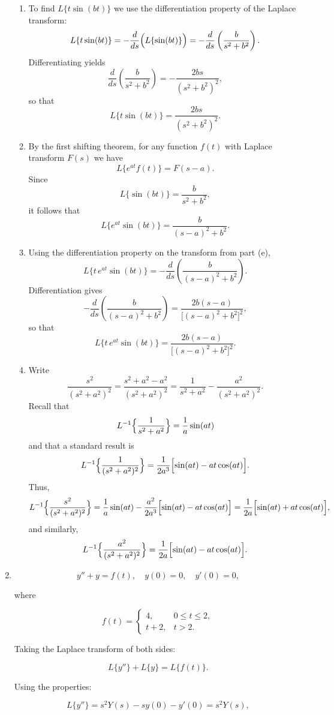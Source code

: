 \documentclass[12pt]{article}
\begin{document}
\begin{enumerate}
\begin{enumerate}[label=(\alph*)]
\item To find \(L\{t\sin(bt)\}\) we use the differentiation property of the Laplace transform:
\[
L\{t\sin(bt)\}=-\frac{d}{ds}\Bigl(L\{\sin(bt)\}\Bigr)
=-\frac{d}{ds}\left(\frac{b}{s^2+b^2}\right).
\]
Differentiating yields
\[
\frac{d}{ds}\left(\frac{b}{s^2+b^2}\right)=-\frac{2bs}{(s^2+b^2)^2},
\]
so that
\[
L\{t\sin(bt)\}=\frac{2bs}{(s^2+b^2)^2}.
\]

\item By the first shifting theorem, for any function \(f(t)\) with Laplace transform \(F(s)\) we have
\[
L\{e^{at}f(t)\}=F(s-a).
\]
Since
\[
L\{\sin(bt)\}=\frac{b}{s^2+b^2},
\]
it follows that
\[
L\{e^{at}\sin(bt)\}=\frac{b}{(s-a)^2+b^2}.
\]

\item Using the differentiation property on the transform from part (e),
\[
L\{t\,e^{at}\sin(bt)\}=-\frac{d}{ds}\left(\frac{b}{(s-a)^2+b^2}\right).
\]
Differentiation gives
\[
-\frac{d}{ds}\left(\frac{b}{(s-a)^2+b^2}\right)
=\frac{2b(s-a)}{\bigl[(s-a)^2+b^2\bigr]^2},
\]
so that
\[
L\{t\,e^{at}\sin(bt)\}=\frac{2b(s-a)}{\bigl[(s-a)^2+b^2\bigr]^2}.
\]

\item Write
\[
\frac{s^2}{(s^2+a^2)^2}=\frac{s^2+a^2-a^2}{(s^2+a^2)^2}
=\frac{1}{s^2+a^2}-\frac{a^2}{(s^2+a^2)^2}.
\]
Recall that
\[
L^{-1}\Bigl\{\frac{1}{s^2+a^2}\Bigr\}=\frac{1}{a}\sin(at)
\]
and that a standard result is
\[
L^{-1}\Bigl\{\frac{1}{(s^2+a^2)^2}\Bigr\}=\frac{1}{2a^3}\Bigl[\sin(at)-at\cos(at)\Bigr].
\]
Thus,
\[
L^{-1}\Bigl\{\frac{s^2}{(s^2+a^2)^2}\Bigr\}
=\frac{1}{a}\sin(at)-\frac{a^2}{2a^3}\Bigl[\sin(at)-at\cos(at)\Bigr]
=\frac{1}{2a}\Bigl[\sin(at)+at\cos(at)\Bigr],
\]
and similarly,
\[
L^{-1}\Bigl\{\frac{a^2}{(s^2+a^2)^2}\Bigr\}
=\frac{1}{2a}\Bigl[\sin(at)-at\cos(at)\Bigr].
\]
\end{enumerate}

\item 
\[
y'' + y = f(t), \quad y(0) = 0, \quad y'(0) = 0,
\]

where

\[
f(t) =
\begin{cases} 
4, & 0 \leq t \leq 2, \\
t + 2, & t > 2.
\end{cases}
\]

Taking the Laplace transform of both sides:

\[
L\{y''\} + L\{y\} = L\{f(t)\}.
\]

Using the properties:

\[
L\{y''\} = s^2 Y(s) - sy(0) - y'(0) = s^2 Y(s),
\]


\end{enumerate}
\end{document}
